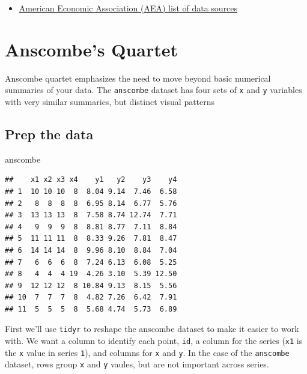 \documentclass[]{book}
\newenvironment{Shaded}{\begin{snugshade}}{\end{snugshade}}
\newcommand{\KeywordTok}[1]{\textcolor[rgb]{0.13,0.29,0.53}{\textbf{{#1}}}}
\newcommand{\DataTypeTok}[1]{\textcolor[rgb]{0.13,0.29,0.53}{{#1}}}
\newcommand{\StringTok}[1]{\textcolor[rgb]{0.31,0.60,0.02}{{#1}}}
\newcommand{\NormalTok}[1]{{#1}}
\providecommand{\tightlist}{%
  \setlength{\itemsep}{0pt}\setlength{\parskip}{0pt}}
\theoremstyle{definition}
\theoremstyle{definition}
\theoremstyle{remark}
\begin{document}
\begin{itemize}
\tightlist
\item
  \href{https://www.aeaweb.org/resources/data}{American Economic
  Association (AEA) list of data sources}
\end{itemize}

\hypertarget{anscombe}{\chapter*{Anscombe's Quartet}\label{anscombe}}

Anscombe quartet emphasizes the need to move beyond basic numerical
summaries of your data. The \texttt{anscombe} dataset has four sets of
\texttt{x} and \texttt{y} variables with very similar summaries, but
distinct visual patterns

\section*{Prep the data}\label{prep-the-data}

\begin{Shaded}
\begin{Highlighting}[]
\NormalTok{anscombe}
\end{Highlighting}
\end{Shaded}

\begin{verbatim}
##    x1 x2 x3 x4    y1   y2    y3    y4
## 1  10 10 10  8  8.04 9.14  7.46  6.58
## 2   8  8  8  8  6.95 8.14  6.77  5.76
## 3  13 13 13  8  7.58 8.74 12.74  7.71
## 4   9  9  9  8  8.81 8.77  7.11  8.84
## 5  11 11 11  8  8.33 9.26  7.81  8.47
## 6  14 14 14  8  9.96 8.10  8.84  7.04
## 7   6  6  6  8  7.24 6.13  6.08  5.25
## 8   4  4  4 19  4.26 3.10  5.39 12.50
## 9  12 12 12  8 10.84 9.13  8.15  5.56
## 10  7  7  7  8  4.82 7.26  6.42  7.91
## 11  5  5  5  8  5.68 4.74  5.73  6.89
\end{verbatim}

First we'll use \texttt{tidyr} to reshape the anscombe dataset to make
it easier to work with. We want a column to identify each point,
\texttt{id}, a column for the series (\texttt{x1} is the \texttt{x}
value in series \texttt{1}), and columns for \texttt{x} and \texttt{y}.
In the case of the \texttt{anscombe} dataset, rows group \texttt{x} and
\texttt{y} vaules, but are not important across series.

\begin{Shaded}
\end{Shaded}
\end{document}
